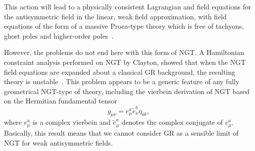 \documentclass[a4paper,10pt]{article}
\begin{document}
This action will lead to a physically consistent Lagrangian and field
equations for the antisymmetric field in the linear, weak field
approximation, with field equations of the form of a massive Proca-type
theory which is free of tachyons, ghost poles and higher-order
poles~\cite{Moffat8,Moffat9}.

However, the problems do not end here with this form of NGT. A Hamiltonian
constraint analysis performed on NGT by Clayton, showed that when the NGT field
equations are expanded about a classical GR background, the resulting theory is
unstable~\cite{Clayton,Clayton2}. This problem appears to be a generic
feature of any fully geometrical NGT-type of theory, including the vierbein
derivation of NGT based on the Hermitian fundamental
tensor~\cite{Moffat6,Moffat7,Chamseddine}
\begin{equation}
g_{\mu\nu}=e^a_\mu {\tilde e}^{b}_\nu\eta_{ab},
\end{equation}
where $e^a_\mu$ is a complex vierbein and ${\tilde e}^a_\mu$ denotes the 
complex conjugate of $e^a_\mu$. Basically, this result means that we cannot
consider GR as a sensible limit of NGT for weak antisymmetric fields.
\end{document}
